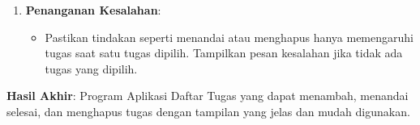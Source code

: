 \begin{enumerate}
	\item \textbf{Penanganan Kesalahan}:
	\begin{itemize}
		\item Pastikan tindakan seperti menandai atau menghapus hanya memengaruhi tugas saat satu tugas dipilih. Tampilkan pesan kesalahan jika tidak ada tugas yang dipilih.
	\end{itemize}
\end{enumerate}

\textbf{Hasil Akhir}: Program Aplikasi Daftar Tugas yang dapat menambah, menandai selesai, dan menghapus tugas dengan tampilan yang jelas dan mudah digunakan.



